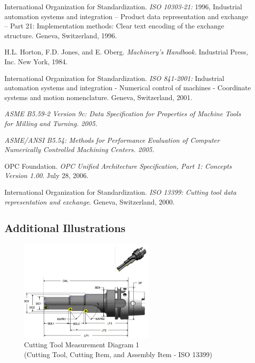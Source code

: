 \documentclass{mtconnect}	%
\begin{document}
International Organization for Standardization. \textit{ISO 10303-21:} 1996, Industrial automation systems and integration -- Product data representation and exchange -- Part 21: Implementation methods: Clear text encoding of the exchange structure. Geneva, Switzerland, 1996.

H.L. Horton, F.D. Jones, and E. Oberg. \textit{Machinery's Handbook}. Industrial Press, Inc. New York, 1984.

International Organization for Standardization. \textit{ISO 841-2001:} Industrial automation systems and integration - Numerical control of machines - Coordinate systems and motion nomenclature. Geneva, Switzerland, 2001.

\textit{ASME B5.59-2 Version 9c: Data Specification for Properties of Machine Tools for Milling and Turning. 2005.}

\textit{ASME/ANSI B5.54: Methods for Performance Evaluation of Computer Numerically Controlled Machining Centers. 2005.}

OPC Foundation. \textit{OPC Unified Architecture Specification, Part 1: Concepts Version 1.00}. July 28, 2006.

International Organization for Standardization. \textit{ISO 13399:  Cutting tool data representation and exchange}. Geneva, Switzerland, 2000.

\pagebreak

\subsection{Additional Illustrations}

\begin{figure}[ht]
  \centering
  \includegraphics[width=0.6\textwidth]{figures/a1-cutting-tool-measurement-diagram-3.png}
  \caption{Cutting Tool Measurement Diagram 1
  \\ (Cutting Tool, Cutting Item, and Assembly Item - ISO 13399)}
  \label{fig:a1-cutting-tool-measurement-diagram-3}
\end{figure}
\FloatBarrier
\end{document}
